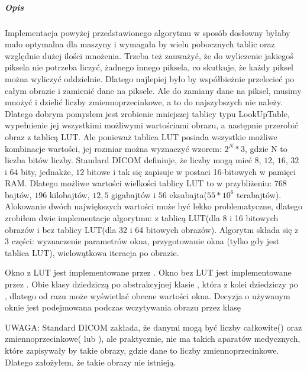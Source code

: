 \subparagraph{Opis}
\par
Implementacja powyżej przedstawionego algorytmu w sposób dosłowny byłaby mało optymalna dla maszyny i wymagała by wielu pobocznych tablic oraz względnie dużej ilości mnożenia.
Trzeba też zauważyć, że do wyliczenie jakiegoś piksela nie potrzeba liczyć, żadnego innego piksela, co skutkuje, że każdy piksel można wyliczyć oddzielnie.
Dlatego najlepiej było by współbieżnie przelecieć po całym obrazie i zamienić dane na piksele.
Ale do zamiany dane na piksel, musimy mnożyć i dzielić liczby zmiennoprzecinkowe, a to do najszybszych nie należy.
Dlatego dobrym pomysłem jest zrobienie mniejszej tablicy typu LookUpTable, wypełnienie jej wszystkimi możliwymi wartościami obrazu, a następnie przerobić obraz z tablicą LUT.
Ale ponieważ tablica LUT posiada wszystkie możliwe kombinacje wartości, jej rozmiar można wyznaczyć wzorem: $2^N*3$, gdzie N to liczba bitów liczby.
Standard DICOM definiuje, że liczby mogą mieć $8$, $12$, $16$, $32$ i $64$ bity, jednakże, $12$ bitowe i tak się zapisuje w postaci 16-bitowych w pamięci RAM.
Dlatego możliwe wartości wielkości tablicy LUT to w przybliżeniu: $768$ bajtów, $196$ kilobajtów, $12,5$ gigabajtów i $56$ eksabajta($55*10^{6}$ terabajtów).
Alokowanie dwóch największych wartości może być lekko problematyczne, dlatego zrobiłem dwie implementacje algorytmu: z tablicą LUT(dla 8 i 16 bitowych obrazów i bez tablicy LUT(dla 32 i 64 bitowych obrazów).
Algorytm składa się z 3 części: wyznaczenie parametrów okna, przygotowanie okna (tylko gdy jest tablica LUT), wielowątkowa iteracja po obrazie.
\par
Okno z LUT jest implementowane przez .
Okno bez LUT jest implementowane przez .
Obie klasy dziedziczą po abstrakcyjnej klasie , która z kolei dziedziczy po , dlatego od razu może wyświetlać obecne wartości okna.
Decyzja o używanym oknie jest podejmowana podczas wczytywania obrazu przez klasę 
\par
UWAGA: Standard DICOM zakłada, że danymi mogą być liczby całkowite() oraz zmiennoprzecinkowe( lub ), ale praktycznie, nie ma takich aparatów medycznych, które zapisywały by takie obrazy, gdzie dane to liczby zmiennoprzecinkowe. Dlatego założyłem, że takie obrazy nie istnieją.

